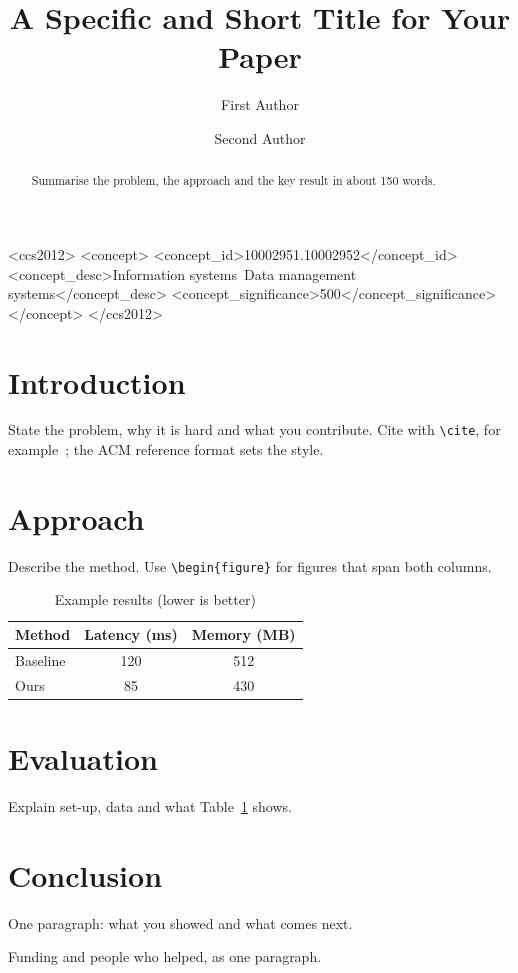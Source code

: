 \documentclass[sigconf,nonacm]{acmart}
\begin{document}
\title{A Specific and Short Title for Your Paper}

\author{First Author}

\author{Second Author}

\begin{abstract}
Summarise the problem, the approach and the key result in about 150 words.
\end{abstract}

\begin{CCSXML}
<ccs2012>
 <concept>
  <concept_id>10002951.10002952</concept_id>
  <concept_desc>Information systems~Data management systems</concept_desc>
  <concept_significance>500</concept_significance>
 </concept>
</ccs2012>
\end{CCSXML}


\maketitle

\section{Introduction}
State the problem, why it is hard and what you contribute. Cite with
\verb|\cite|, for example~\cite{knuth84}; the ACM reference format sets the style.

\section{Approach}
Describe the method. Use \verb|\begin{figure}| for figures that span both columns.

\begin{table}
  \caption{Example results (lower is better)}
  \label{tab:results}
  \begin{tabular}{lcc}
    \toprule
    Method & Latency (ms) & Memory (MB) \\
    \midrule
    Baseline & 120 & 512 \\
    Ours & 85 & 430 \\
    \bottomrule
  \end{tabular}
\end{table}

\section{Evaluation}
Explain set-up, data and what Table~\ref{tab:results} shows.

\section{Conclusion}
One paragraph: what you showed and what comes next.

\begin{acks}
Funding and people who helped, as one paragraph.
\end{acks}



\end{document}
